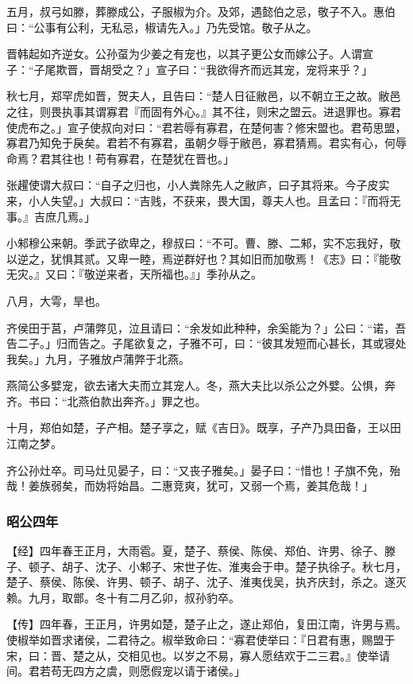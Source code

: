 \documentclass[]{article}
\begin{document}
五月，叔弓如滕，葬滕成公，子服椒为介。及郊，遇懿伯之忌，敬子不入。惠伯曰：``公事有公利，无私忌，椒请先入。」乃先受馆。敬子从之。

晋韩起如齐逆女。公孙虿为少姜之有宠也，以其子更公女而嫁公子。人谓宣子：``子尾欺晋，晋胡受之？」宣子曰：``我欲得齐而远其宠，宠将来乎？」

秋七月，郑罕虎如晋，贺夫人，且告曰：``楚人日征敝邑，以不朝立王之故。敝邑之往，则畏执事其谓寡君『而固有外心。』其不往，则宋之盟云。进退罪也。寡君使虎布之。」宣子使叔向对曰：``君若辱有寡君，在楚何害？修宋盟也。君苟思盟，寡君乃知免于戾矣。君若不有寡君，虽朝夕辱于敝邑，寡君猜焉。君实有心，何辱命焉？君其往也！苟有寡君，在楚犹在晋也。」

张趯使谓大叔曰：``自子之归也，小人粪除先人之敝庐，曰子其将来。今子皮实来，小人失望。」大叔曰：``吉贱，不获来，畏大国，尊夫人也。且孟曰：『而将无事。』吉庶几焉。」

小邾穆公来朝。季武子欲卑之，穆叔曰：``不可。曹、滕、二邾，实不忘我好，敬以逆之，犹惧其贰。又卑一睦，焉逆群好也？其如旧而加敬焉！《志》曰：『能敬无灾。』又曰：『敬逆来者，天所福也。』」季孙从之。

八月，大雩，旱也。

齐侯田于莒，卢蒲弊见，泣且请曰：``余发如此种种，余奚能为？」公曰：``诺，吾告二子。」归而告之。子尾欲复之，子雅不可，曰：``彼其发短而心甚长，其或寝处我矣。」九月，子雅放卢蒲弊于北燕。

燕简公多嬖宠，欲去诸大夫而立其宠人。冬，燕大夫比以杀公之外嬖。公惧，奔齐。书曰：``北燕伯款出奔齐。」罪之也。

十月，郑伯如楚，子产相。楚子享之，赋《吉日》。既享，子产乃具田备，王以田江南之梦。

齐公孙灶卒。司马灶见晏子，曰：``又丧子雅矣。」晏子曰：``惜也！子旗不免，殆哉！姜族弱矣，而妫将始昌。二惠竞爽，犹可，又弱一个焉，姜其危哉！」

\hypertarget{header-n2422}{%
\subsubsection{昭公四年}\label{header-n2422}}

【经】四年春王正月，大雨雹。夏，楚子、蔡侯、陈侯、郑伯、许男、徐子、滕子、顿子、胡子、沈子、小邾子、宋世子佐、淮夷会于申。楚子执徐子。秋七月，楚子、蔡侯、陈侯、许男、顿子、胡子、沈子、淮夷伐吴，执齐庆封，杀之。遂灭赖。九月，取鄫。冬十有二月乙卯，叔孙豹卒。

【传】四年春，王正月，许男如楚，楚子止之，遂止郑伯，复田江南，许男与焉。使椒举如晋求诸侯，二君待之。椒举致命曰：``寡君使举曰：『日君有惠，赐盟于宋，曰：晋、楚之从，交相见也。以岁之不易，寡人愿结欢于二三君。』使举请间。君若苟无四方之虞，则愿假宠以请于诸侯。」
\end{document}
